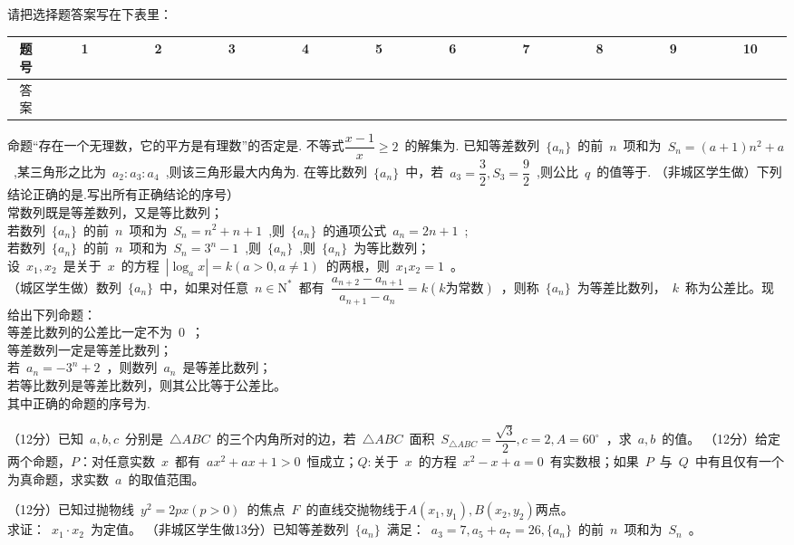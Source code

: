 \documentclass{BHCexam}
\begin{document}
\begin{questions}
请把选择题答案写在下表里：\\%
\begin{tabular}{|c|c|c|c|c|c|c|c|c|c|c|}
\hline
题号&~~~~1~~~~&~~~~2~~~~&~~~~3~~~~&~~~~4~~~~&~~~~5~~~~&~~~~6~~~~&~~~~7~~~~&~~~~8~~~~&~~~~9~~~~&~~~~10~~~~  \\
\hline
答案&&&&&&&&&&  \\
\hline

\end{tabular}
\tiankong
\qs 命题“存在一个无理数，它的平方是有理数”的否定是\ltk.
\qs 不等式$\dfrac{x-1}{x}\geq 2$~的解集为\ltk.
\qs 已知等差数列~$\{a_n \}$~的前~$n$~项和为~$S_n=(a+1)n^2+a$~,某三角形之比为~$a_2:a_3:a_4$~,则该三角形最大内角为\ltk.
\qs 在等比数列~$\{a_n \}$~中，若~$a_3=\dfrac{3}{2},S_3=\dfrac{9}{2}$~,则公比~$q$~的值等于\ltk.
\qs （非城区学生做）下列结论正确的是\ltk.写出所有正确结论的序号）\\
常数列既是等差数列，又是等比数列；\\
若数列~$\{a_n \}$~的前~$n$~项和为~$S_n=n^2+n+1$~,则~$\{a_n \}$~的通项公式~$a_n=2n+1$~;\\
若数列~$\{a_n \}$~的前~$n$~项和为~$S_n=3^n-1$~,则~$\{a_n \}$~,则~$\{a_n \}$~为等比数列；\\
设~$x_1,x_2$~是关于~$x$~的方程~$\left| \log_a x \right|=k(a>0,a\neq 1)$~的两根，则~$x_1x_2=1$~。\\
（城区学生做）数列~$\{a_n \}$~中，如果对任意~$n\in \mathrm{N^*}$~都有~$\dfrac{a_{n+2}-a_{n+1}}{a_{n+1}-a_n}=k(k\text{为常数})$~，则称~$\{a_n \}$~为等差比数列，~$k$~称为公差比。现给出下列命题：\\
等差比数列的公差比一定不为~$0$~；\\
等差数列一定是等差比数列；\\
若~$a_n=-3^n+2$~，则数列~${a_n}$~是等差比数列；\\
若等比数列是等差比数列，则其公比等于公差比。\\
其中正确的命题的序号为\ltk.

\jianda
\qs （12分）已知~$a,b,c$~分别是~$\triangle ABC$~的三个内角所对的边，若~$\triangle ABC$~面积~$S_{\triangle ABC}=\dfrac{\sqrt{3}}{2},c=2,A=60^{\circ}$~，求~$a,b$~的值。
\vspace{7cm}
\qs （12分）给定两个命题，$P：$对任意实数~$x$~都有~$ax^2+ax+1>0$~恒成立；$Q:$关于~$x$~的方程~$x^2-x+a=0$~有实数根；如果~$P$~与~$Q$~中有且仅有一个为真命题，求实数~$a$~的取值范围。

\vspace{7cm}
\qs （12分）已知过抛物线~$y^2=2px(p>0)$~的焦点~$F$~的直线交抛物线于$A(x_1,y_1),B(x_2,y_2)$两点。\\
求证：~$x_1\cdot x_2$~为定值。
\vspace{7cm}
\qs （非城区学生做13分）已知等差数列~$\{a_n \}$~满足：~$a_3=7,a_5+a_7=26,\{a_n \}$~的前~$n$~项和为~$S_n$~。
\begin{parts}

\end{parts}
\end{questions}
\end{document}
